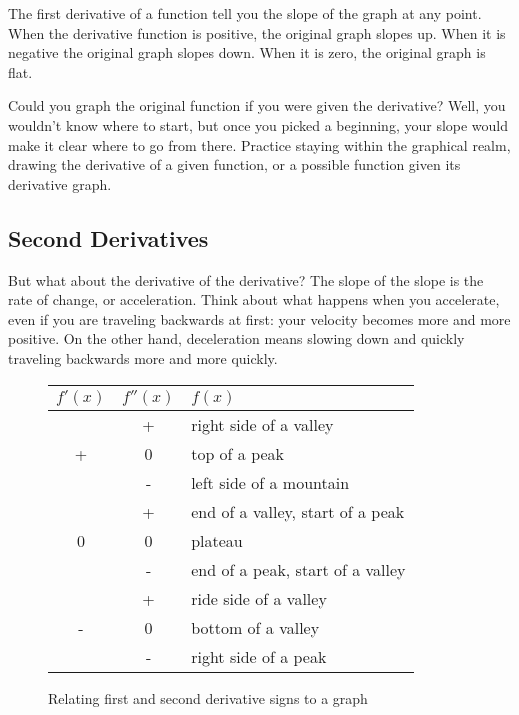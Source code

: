 


The first derivative of a function tell you the slope of the graph at any point.  When the
derivative function is positive, the original graph slopes up.  When it is negative the original
graph slopes down.  When it is zero, the original graph is flat.  

Could you graph the original function if you were given the derivative?  Well, you wouldn't 
know where to start, but once you picked a beginning, your slope would make it clear
where to go from there.  Practice staying within the graphical realm, drawing the derivative
of a given function, or a possible function given its derivative graph.


\subsection{Second Derivatives}
But what about the derivative of the derivative?
The slope of the slope is the rate of change, or acceleration.  Think about what happens when
you accelerate, even if you are traveling backwards at first: your velocity becomes more and more
positive.  On the other hand, deceleration means slowing down and quickly traveling backwards more and
more quickly.

\begin{figure}
\begin{centering}
\begin{tabular}{ |c|c|l| }
\hline
$f'(x)$ & $f''(x)$ & $f(x)$ \\ \hline \hline
\multirow{3}{*}{ + } & + & right side of a valley \\ \cline{2-3}
 & 0 & top of a peak \\ \cline{2-3}
 & - & left side of a mountain \\ \hline
\multirow{3}{*}{ 0 } & + & end of a valley, start of a peak \\ \cline{2-3}
 & 0 & plateau \\ \cline{2-3}
 & - & end of a peak, start of a valley \\ \hline
\multirow{3}{*}{ - } & + & ride side of a valley \\ \cline{2-3}
 & 0 & bottom of a valley \\ \cline{2-3}
 & - & right side of a peak \\
\hline
\end{tabular}
\caption{Relating first and second derivative signs to a graph}
\end{centering}
\end{figure}


